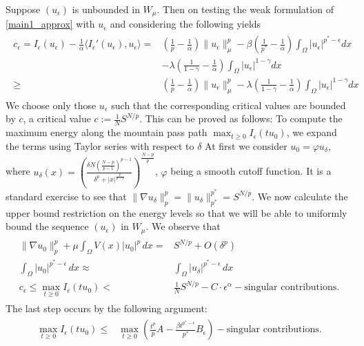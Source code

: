 \documentclass[12pt]{extarticle}
\theoremstyle{definition}
\theoremstyle{remark}
\theoremstyle{definition}
\numberwithin{equation}{section}
\numberwithin{equation}{section}
\begin{document}
		Suppose $(u_{\epsilon})$ is unbounded in $W_{\mu}$. Then on testing the weak formulation of \eqref{main1_approx} with $u_{\epsilon}$ and considering the following yields 
		\begin{align}\label{Talenti0}
			\begin{split}
		c_{\epsilon}=I_{\epsilon}(u_{\epsilon})-\frac{1}{\alpha}\langle I_{\epsilon}'(u_{\epsilon}),u_{\epsilon}\rangle=&\left(\frac{1}{p}-\frac{1}{\alpha}\right)\|u_{\epsilon}\|_{\mu}^p-\beta\left(\frac{1}{p^*}-\frac{1}{\alpha}\right)\int_{\Omega}|u_{\epsilon}|^{p^*-\epsilon}dx\\
			&-\lambda\left(\frac{1}{1-\gamma}-\frac{1}{\alpha}\right)\int_{\Omega}|u_{\epsilon}|^{1-\gamma}dx\\
			\geq &\left(\frac{1}{p}-\frac{1}{\alpha}\right)\|u_{\epsilon}\|_{\mu}^p-\lambda\left(\frac{1}{1-\gamma}-\frac{1}{\alpha}\right)\int_{\Omega}|u_{\epsilon}|^{1-\gamma}dx
				\end{split}
				\end{align}
		We choose only those $u_{\epsilon}$ such that the corresponding critical values are bounded by $c$, a critical value $c:=\frac{1}{N} S^{N/p} $. This can be proved as follows:
		To compute the maximum energy along the mountain pass path $\max_{t \geq 0} I_\epsilon(t u_0)$, we expand the terms using Taylor series with respect to $\delta$ At first we consider $u_0=\varphi u_{\delta}$, where $u_{\delta}(x)=\left(\frac{\delta N\left(\frac{N-p}{p-1}\right)^{p-1}}{\delta^p+|x|^{\frac{p}{p-1}}}\right)^{\frac{N-p}{p}}$, $\varphi$ being a smooth cutoff function. It is a standard exercise to see that $\|\nabla u_\delta\|_p^p = \|u_\delta\|_{p^*}^{p^*} = S^{N/p}$. We now calculate the upper bound restriction on the energy levels so that we will be able to uniformly bound the sequence $(u_{\epsilon})$ in $W_{\mu}$. We observe that
		\begin{align}\label{talenti1}
		\begin{split}
		\|\nabla u_0\|_p^p + \mu \int_\Omega V(x)|u_0|^p \, dx = &S^{N/p} + O(\delta^{p})\\
		\int_\Omega |u_0|^{p^*-\epsilon} \, dx \approx & \int_\Omega |u_\delta|^{p^*-\epsilon} \, dx\\
		c_\epsilon \leq \max_{t \geq 0} I_\epsilon(t u_0) < &\frac{1}{N} S^{N/p} - C \cdot \epsilon^\alpha - \text{singular contributions}.
		\end{split}
		\end{align}
		The last step occurs by the following argument:
		\begin{align}\label{talenti2}
		\begin{split}
			\max_{t \geq 0} I_\epsilon(t u_0) \leq &\max_{t \geq 0} \left( \frac{t^p}{p} A - \frac{\beta t^{p^*-\epsilon}}{p^*} B_\epsilon \right) - \text{singular contributions}.
			\end{split}
			\end{align}
\end{document}
